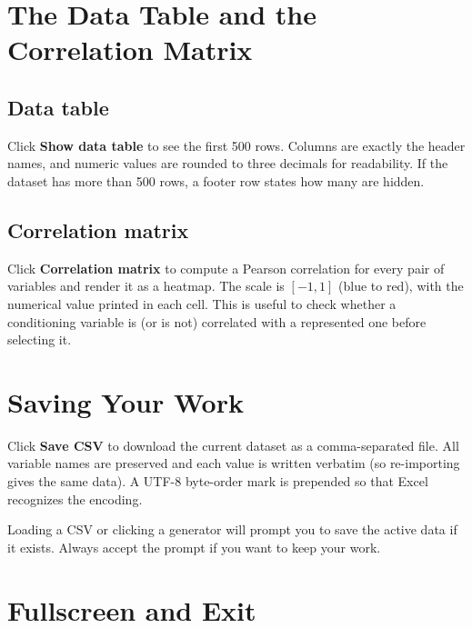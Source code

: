 \documentclass[11pt,a4paper]{article}
\begin{document}
\section{The Data Table and the Correlation Matrix}

\subsection{Data table}

Click \textbf{Show data table} to see the first 500 rows. Columns are exactly the header names, and numeric values are rounded to three decimals for readability. If the dataset has more than 500 rows, a footer row states how many are hidden.

\subsection{Correlation matrix}

Click \textbf{Correlation matrix} to compute a Pearson correlation for every pair of variables and render it as a heatmap. The scale is $[-1,1]$ (blue to red), with the numerical value printed in each cell. This is useful to check whether a conditioning variable is (or is not) correlated with a represented one before selecting it.

\section{Saving Your Work}

Click \textbf{Save CSV} to download the current dataset as a comma-separated file. All variable names are preserved and each value is written verbatim (so re-importing gives the same data). A UTF-8 byte-order mark is prepended so that Excel recognizes the encoding.

\begin{warnbox}
Loading a CSV or clicking a generator will prompt you to save the active data if it exists. Always accept the prompt if you want to keep your work.
\end{warnbox}

\section{Fullscreen and Exit}
\end{document}
